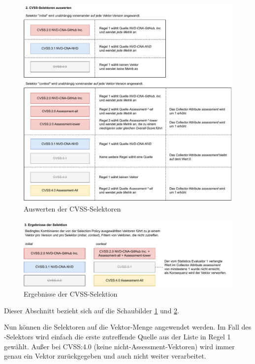 \begin{figure}[htbp] %
    \centering
    \includegraphics[width=1\textwidth, keepaspectratio]{res/grafiken/cvss-selection-process-selection-2}
    \caption{Auswerten der CVSS-Selektoren}
    \label{fig:cvss-selection-process-selection-2}
\end{figure}

\begin{figure}[htbp] %
    \centering
    \includegraphics[width=1\textwidth, keepaspectratio]{res/grafiken/cvss-selection-process-selection-3}
    \caption{Ergebnisse der CVSS-Selektion}
    \label{fig:cvss-selection-process-selection-3}
\end{figure}

Dieser Abschnitt bezieht sich auf die Schaubilder \ref{fig:cvss-selection-process-selection-2} und \ref{fig:cvss-selection-process-selection-3}.

Nun können die Selektoren auf die Vektor-Menge angewendet werden.
Im Fall des -Selektors wird einfach die erste zutreffende Quelle aus der Liste in Regel 1 gewählt.
Außer bei CVSS:4.0 (keine nicht-Assessment-Vektoren) wird immer genau ein Vektor zurückgegeben und auch nicht weiter verarbeitet.

